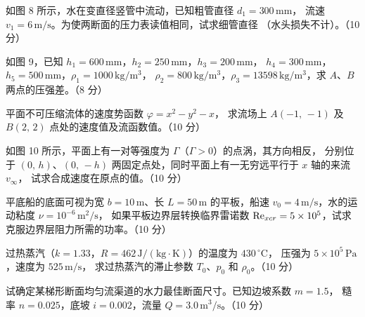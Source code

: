 \begin{ti}
  \item 如图 8 所示，水在变直径竖管中流动，已知粗管直径 $d_1=300\,\mathrm{mm}$，
  流速 $v_1=6\,\mathrm{m/s}$。为使两断面的压力表读值相同，试求细管直径
  （水头损失不计）。（10 分）\hfill{}

  \item 如图 9，已知 $h_1=600\,\mathrm{mm}$，$h_2=250\,\mathrm{mm}$，$h_3=200\,\mathrm{mm}$，
  $h_4=300\,\mathrm{mm}$，$h_5=500\,\mathrm{mm}$，$\rho_1=1000\,\mathrm{kg/m^3}$，
  $\rho_2=800\,\mathrm{kg/m^3}$，$\rho_3=13598\,\mathrm{kg/m^3}$，求 $A$、$B$ 两点的压强差。（8 分）
  \hfill{}

  \item 平面不可压缩流体的速度势函数 $\varphi=x^{2}-y^{2}-x$，
  求流场上 $A(-1,\,-1)$ 及 $B(2,\,2)$ 点处的速度值及流函数值。（10 分）
  \hfill{}

  \item 如图 10 所示，平面上有一对等强度为 $\Gamma$（$\Gamma>0$）的点涡，其方向相反，
  分别位于 $(0,\,h)$、$(0,\,-h)$ 两固定点处，同时平面上有一无穷远平行于 $x$ 轴的来流 $v_\infty$，
  试求合成速度在原点的值。（10 分）\hfill{}

  \item 平底船的底面可视为宽 $b=10\,\mathrm{m}$、长 $L=50\,\mathrm{m}$ 的平板，船速
  $v_0=4\,\mathrm{m/s}$，水的运动粘度 $\nu=10^{-6}\,\mathrm{m^2/s}$，
  如果平板边界层转换临界雷诺数 $\mathrm{Re}_{xcr}=5\times10^{5}$，试求克服边界层阻力所需的功率。（10 分）
  \hfill{}

  \item 过热蒸汽（$k=1.33$，$R=462\,\mathrm{J/(kg\cdot K)}$）的温度为 $430\,^\circ\mathrm{C}$，
  压强为 $5\times10^{5}\,\mathrm{Pa}$，速度为 $525\,\mathrm{m/s}$，
  求过热蒸汽的滞止参数 $T_0$、$p_0$ 和 $\rho_0$。（10 分）\hfill{}

  \item 试确定某梯形断面均匀流渠道的水力最佳断面尺寸。已知边坡系数 $m=1.5$，
  糙率 $n=0.025$，底坡 $i=0.002$，流量 $Q=3.0\,\mathrm{m^3/s}$。（10 分）
  \hfill{}
\end{ti}

